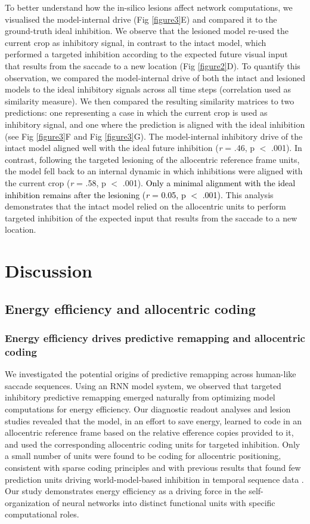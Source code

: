 \documentclass[10pt,letterpaper]{article}
\begin{document}
To better understand how the in-silico lesions affect network computations, we visualised the model-internal drive (Fig \ref{figure3}E) and compared it to the ground-truth ideal inhibition. We observe that the lesioned model re-used the current crop as inhibitory signal, in contrast to the intact model, which performed a targeted inhibition according to the expected future visual input that results from the saccade to a new location (Fig \ref{figure2}D). To quantify this observation, we compared the model-internal drive of both the intact and lesioned models to the ideal inhibitory signals across all time steps (correlation used as similarity measure). We then compared the resulting similarity matrices to two predictions: one representing a case in which the current crop is used as inhibitory signal, and one where the prediction is aligned with the ideal inhibition (see Fig \ref{figure3}F and Fig \ref{figure3}G). The model-internal inhibitory drive of the intact model aligned well with the ideal future inhibition (\textit{r} = .46, p $<$ .001). In contrast, following the targeted lesioning of the allocentric reference frame units, the model fell back to an internal dynamic in which inhibitions were aligned with the current crop (\textit{r} = .58, p $<$ .001). \textcolor{black}{Only a minimal alignment with the ideal inhibition remains after the lesioning (\textit{r} = 0.05, p $<$ .001).} This analysis demonstrates that the intact model relied on the allocentric units to perform targeted inhibition of the expected input that results from the saccade to a new location.

\section{Discussion}
\subsection{Energy efficiency and allocentric coding}
\subsubsection{Energy efficiency drives predictive remapping and allocentric coding}
We investigated the potential origins of predictive remapping across human-like saccade sequences. Using an RNN model system, we observed that targeted inhibitory predictive remapping emerged naturally from optimizing model computations for energy efficiency. Our diagnostic readout analyses and lesion studies revealed that the model, in an effort to save energy, learned to code in an allocentric reference frame based on the relative efference copies provided to it, and used the corresponding allocentric coding units for targeted inhibition. Only a small number of units were found to be coding for allocentric positioning, consistent with sparse coding principles and with previous results that found few prediction units driving world-model-based inhibition in temporal sequence data \citep{ali_predictive_2022}. Our study demonstrates energy efficiency as a driving force in the self-organization of neural networks into distinct functional units with specific computational roles.
\end{document}
